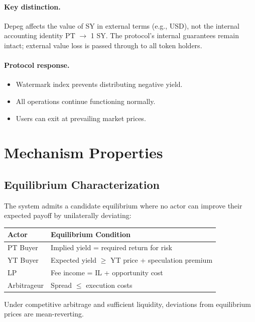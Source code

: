 \paragraph{Key distinction.} Depeg affects the value of SY in external terms (e.g., USD), not the internal accounting identity PT $\to$ 1 SY. The protocol's internal guarantees remain intact; external value loss is passed through to all token holders.

\paragraph{Protocol response.}
\begin{itemize}
\item Watermark index prevents distributing negative yield.
\item All operations continue functioning normally.
\item Users can exit at prevailing market prices.
\end{itemize}

\section{Mechanism Properties}

\subsection{Equilibrium Characterization}

The system admits a candidate equilibrium where no actor can improve their expected payoff by unilaterally deviating:

\begin{center}
\begin{tabular}{ll}
\toprule
\textbf{Actor} & \textbf{Equilibrium Condition} \\
\midrule
PT Buyer & Implied yield = required return for risk \\
YT Buyer & Expected yield $\geq$ YT price + speculation premium \\
LP & Fee income = IL + opportunity cost \\
Arbitrageur & Spread $\leq$ execution costs \\
\bottomrule
\end{tabular}
\end{center}

Under competitive arbitrage and sufficient liquidity, deviations from equilibrium prices are mean-reverting.

